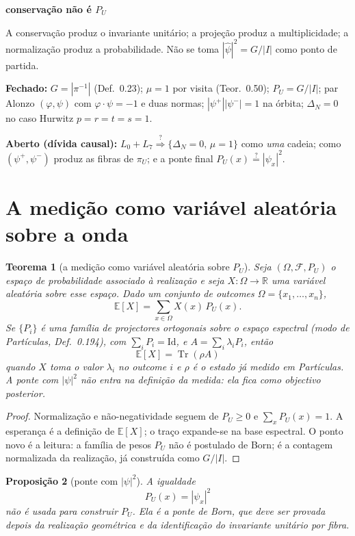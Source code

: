 \documentclass[11pt,a4paper]{article}
\newtheorem{teorema}{Teorema}
\newtheorem{proposicao}[teorema]{Proposição}
\begin{document}
\begin{center}
\bfseries conservação não é $P_U$
\end{center}
A conservação produz o invariante unitário; a projeção produz a multiplicidade;
a normalização produz a probabilidade. Não se toma $|\widehat\psi|^2=G/|I|$ como ponto
de partida.

\textbf{Fechado:} $G=|\pi^{-1}|$ (Def.~0.23); $\mu=1$ por visita (Teor.~0.50);
$P_U=G/|I|$; par Alonzo $(\varphi,\psi)$ com $\varphi\cdot\psi=-1$ e duas normas;
$|\psi^+||\psi^-|=1$ na órbita; $\Delta_N=0$ no caso Hurwitz $p=r=t=s=1$.

\textbf{Aberto (dívida causal):}
$L_0+L_7\stackrel{?}{\Longrightarrow}\{\Delta_N=0,\,\mu=1\}$ como \emph{uma} cadeia;
como $(\psi^+,\psi^-)$ produz as fibras de $\pi_U$; e a ponte final
$P_U(x)\stackrel{?}{=}|\psi_x|^2$.

\section{A medição como variável aleatória sobre a onda}

\begin{teorema}[a medição como variável aleatória sobre $P_U$]
\label{thm:medicao-va}
Seja $(\Omega,\mathcal F,P_U)$ o espaço de probabilidade associado à realização e seja $X:\Omega\to\mathbb R$
uma variável aleatória sobre esse espaço. Dado um conjunto de outcomes $\Omega=\{x_1,\ldots,x_n\}$,
\[
\mathbb E[X]=\sum_{x\in\Omega} X(x)\,P_U(x).
\]
Se $\{P_i\}$ é uma família de projectores ortogonais sobre o espaço espectral (modo de Partículas,
Def.~0.194), com $\sum_i P_i=\mathrm{Id}$, e $A=\sum_i\lambda_i P_i$, então
\[
\mathbb E[X]=\operatorname{Tr}(\rho A)
\]
quando $X$ toma o valor $\lambda_i$ no outcome $i$ e $\rho$ é o estado já medido em Partículas.
A ponte com $|\psi|^2$ não entra na definição da medida: ela fica como objectivo posterior.
\end{teorema}

\begin{proof}
Normalização e não-negatividade seguem de $P_U\ge 0$ e $\sum_x P_U(x)=1$.
A esperança é a definição de $\mathbb{E}[X]$; o traço expande-se na base espectral.
O ponto novo é a leitura: a família de pesos $P_U$ não é postulado de Born; é a contagem
normalizada da realização, já construída como $G/|I|$.
\end{proof}

\begin{proposicao}[ponte com $|\psi|^2$]
\label{prop:born-ponte}
A igualdade
\[
P_U(x)=|\psi_x|^2
\]
não é usada para construir $P_U$. Ela é a ponte de Born, que deve ser provada depois da
realização geométrica e da identificação do invariante unitário por fibra.
\end{proposicao}
\end{document}
